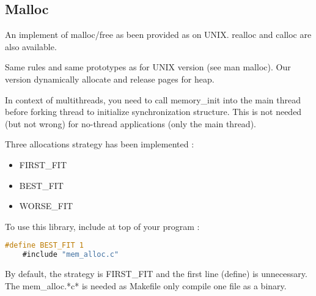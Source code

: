 \subsection{Malloc}
  An implement of malloc/free as been provided as on UNIX. realloc and calloc
  are also available.

  Same rules and same prototypes as for UNIX version (see man malloc). Our
  version dynamically allocate and release pages for heap.

  In context of multithreads, you need to call memory\_init into the main thread
  before forking thread to initialize synchronization structure. This is not
  needed (but not wrong) for no-thread applications (only the main thread).

  Three allocations strategy has been implemented :
  \begin{itemize}
  \item FIRST\_FIT
  \item BEST\_FIT
  \item WORSE\_FIT
  \end{itemize}
  To use this library, include at top of your program :

  \begin{lstlisting}[language=C]
    #define BEST_FIT 1 
    #include "mem_alloc.c"
  \end{lstlisting}
  By default, the strategy is FIRST\_FIT and the first line (define) is
  unnecessary. The mem\_alloc.*c* is needed as Makefile only compile one file as
  a binary.

